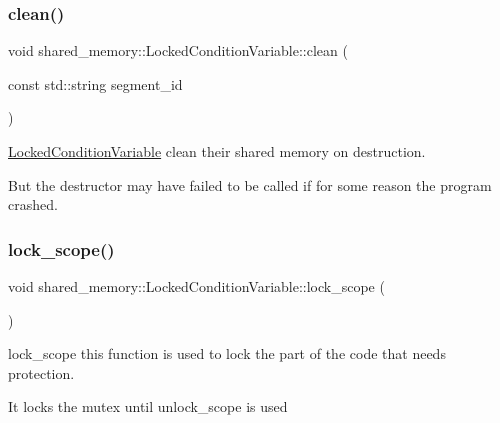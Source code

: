 \subsubsection{\texorpdfstring{clean()}{clean()}}
{\footnotesize\ttfamily void shared\+\_\+memory\+::\+Locked\+Condition\+Variable\+::clean (\begin{DoxyParamCaption}\item[{const std\+::string}]{segment\+\_\+id }\end{DoxyParamCaption})\hspace{0.3cm}{\ttfamily [static]}}



\hyperlink{classshared__memory_1_1LockedConditionVariable}{Locked\+Condition\+Variable} clean their shared memory on destruction. 

But the destructor may have failed to be called if for some reason the program crashed. \mbox{\label{classshared__memory_1_1LockedConditionVariable_a1eef63f7e3e898c3734923c987383ffe}} 
\subsubsection{\texorpdfstring{lock\+\_\+scope()}{lock\_scope()}}
{\footnotesize\ttfamily void shared\+\_\+memory\+::\+Locked\+Condition\+Variable\+::lock\+\_\+scope (\begin{DoxyParamCaption}{ }\end{DoxyParamCaption})}



lock\+\_\+scope this function is used to lock the part of the code that needs protection. 

It locks the mutex until unlock\+\_\+scope is used \mbox{\label{classshared__memory_1_1LockedConditionVariable_a0d4ab218fc51fcce34146f2adca408d7}} 
